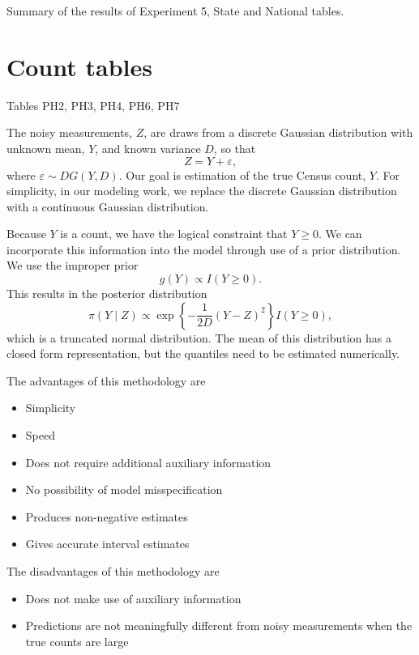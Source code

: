 \documentclass{article}
\begin{document}
Summary of the results of Experiment 5, State and National tables.

\section{Count tables}

Tables PH2, PH3, PH4, PH6, PH7

The noisy measurements, \(Z\), are draws from a discrete Gaussian distribution
with unknown mean, \(Y\), and known variance \(D\), so that
\begin{equation*}
  Z = Y + \varepsilon,
\end{equation*}
where \(\varepsilon \sim DG(Y, D)\).  Our goal is estimation of the true Census
count, \(Y\).  For simplicity, in our modeling work, we replace the discrete
Gaussian distribution with a continuous Gaussian distribution.

Because \(Y\) is a count, we have the logical constraint that \(Y \geq 0\).  We
can incorporate this information into the model through use of a prior
distribution.  We use the improper prior
\begin{equation*}
  g (Y) \propto I \left( Y \geq 0 \right).
\end{equation*}
This results in the posterior distribution
\begin{equation*}
  \pi \left( Y \mid Z \right) \propto \exp \left\{ -\frac{1}{2D} \left( Y - Z
    \right)^2 \right\} I \left( Y \geq 0 \right),
\end{equation*}
which is a truncated normal distribution.  The mean of this distribution has a
closed form representation, but the quantiles need to be estimated numerically.

The advantages of this methodology are
\begin{itemize}
  \item Simplicity
  \item Speed
  \item Does not require additional auxiliary information
  \item No possibility of model misspecification
  \item Produces non-negative estimates
  \item Gives accurate interval estimates
\end{itemize}

The disadvantages of this methodology are
\begin{itemize}
  \item Does not make use of auxiliary information
  \item Predictions are not meaningfully different from noisy measurements when
    the true counts are large
\end{itemize}
\end{document}

